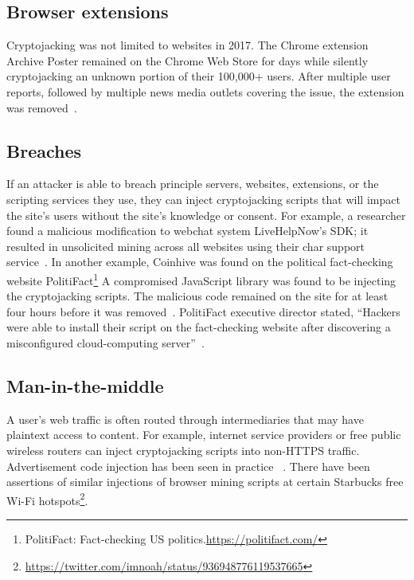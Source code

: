 \subsection{Browser extensions} 

Cryptojacking was not limited to websites in 2017. The Chrome extension Archive Poster remained on the Chrome Web Store for days while silently cryptojacking an unknown portion of their 100,000+ users. After multiple user reports, followed by multiple news media outlets covering the issue, the extension was removed~\cite{chromeextentioncoinhive}. 

\subsection{Breaches} 


If an attacker is able to breach principle servers, websites, extensions, or the scripting services they use, they can inject cryptojacking scripts that will impact the site's users without the site's knowledge or consent. For example, a researcher found a malicious modification to webchat system LiveHelpNow's SDK; it resulted in unsolicited mining across all websites using their char support service~\cite{chatsupporthack}. In another example, Coinhive was found on the political fact-checking website PolitiFact\footnote{PolitiFact: Fact-checking US politics.\url{https://politifact.com/}} A compromised JavaScript library was found to be injecting the cryptojacking scripts. The malicious code remained on the site for at least four hours before it was removed~\cite{politifactcoinhive}. PolitiFact executive director stated, ``Hackers were able to install their script on the fact-checking website after discovering a misconfigured cloud-computing server''~\cite{politifactcoinhivewsj}.


\subsection{Man-in-the-middle} 

A user's web traffic is often routed through intermediaries that may have plaintext access to content. For example, internet service providers or free public wireless routers can inject cryptojacking scripts into non-HTTPS traffic. Advertisement code injection has been seen in practice ~\cite{vergeadinjection}. There have been assertions of similar injections of browser mining scripts at certain Starbucks free Wi-Fi hotspots\footnote{\url{https://twitter.com/imnoah/status/936948776119537665}}.






